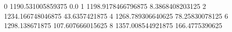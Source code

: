 0 1190.531005859375 0.0
1 1198.9178466796875 8.3868408203125
2 1234.166748046875 43.6357421875
4 1268.789306640625 78.25830078125
6 1298.138671875 107.607666015625
8 1357.008544921875 166.4775390625
